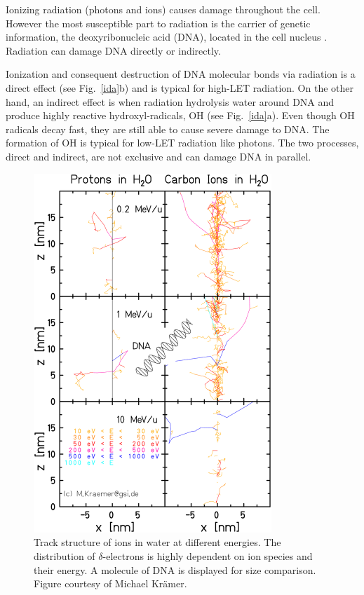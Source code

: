 Ionizing radiation (photons and ions) causes damage throughout the cell. However the most susceptible part to radiation is the
carrier of genetic information, the deoxyribonucleic acid (DNA), located in the cell nucleus \cite{Munro1970}. Radiation can damage DNA directly or indirectly.

Ionization and consequent destruction of DNA molecular bonds via radiation is a direct effect (see Fig.~\ref{ida}b) and is typical for high-LET radiation. On the other hand, an indirect effect is when radiation hydrolysis water around DNA and produce highly reactive hydroxyl-radicals, OH 
(see Fig.~\ref{ida}a). Even though OH radicals decay fast, they are still able to cause severe damage to DNA. The formation of OH is typical for low-LET radiation like photons. The two processes, direct and indirect, are not exclusive and can damage DNA in parallel.


\newpage

\begin{figure}[H]
\begin{center}
\includegraphics[width=0.8\textwidth]{./Fundamentals/Images/trackstructure.png}
\caption{Track structure of ions in water at different energies. The distribution of $\delta$-electrons is highly dependent on ion species and their energy.
A molecule of DNA is displayed for size comparison. Figure courtesy of Michael Kr\"amer.}
\label{track}
\end{center}
\end{figure}


